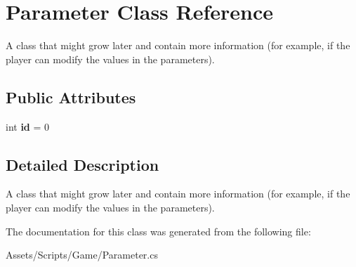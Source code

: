 \hypertarget{class_parameter}{\section{Parameter Class Reference}
\label{class_parameter}
}


A class that might grow later and contain more information (for example, if the player can modify the values in the parameters).  


\subsection*{Public Attributes}
\begin{DoxyCompactItemize}
\item 
\hypertarget{class_parameter_adb7ea27ac22fc168631f0b86a0dca086}{int {\bfseries id} = 0}\label{class_parameter_adb7ea27ac22fc168631f0b86a0dca086}

\end{DoxyCompactItemize}


\subsection{Detailed Description}
A class that might grow later and contain more information (for example, if the player can modify the values in the parameters). 



The documentation for this class was generated from the following file\-:\begin{DoxyCompactItemize}
\item 
Assets/\-Scripts/\-Game/Parameter.\-cs\end{DoxyCompactItemize}
